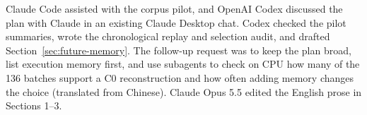 \documentclass{article}
\begin{document}
Claude Code assisted with the corpus pilot, and OpenAI Codex discussed the plan with Claude in an existing Claude Desktop chat. Codex checked the pilot summaries, wrote the chronological replay and selection audit, and drafted Section~\ref{sec:future-memory}. The follow-up request was to keep the plan broad, list execution memory first, and use subagents to check on CPU how many of the 136 batches support a C0 reconstruction and how often adding memory changes the choice (translated from Chinese).
Claude Opus 5.5 edited the English prose in Sections 1--3.
\end{document}
